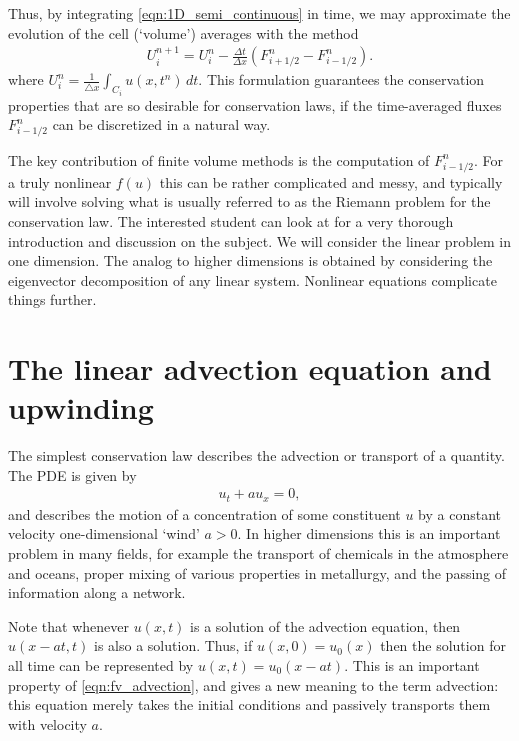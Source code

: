 Thus, by integrating \eqref{eqn:1D_semi_continuous} in time, we may approximate the evolution of the cell (`volume') averages with the method
\begin{align}\label{eqn:flux_form}
U_i^{n+1} = U_i^n - \frac{\Delta t}{\Delta x} \left(F^n_{i+1/2}-F^n_{i-1/2}\right).
\end{align}
where $U_i^n = \frac{1}{\triangle x} \int_{C_i} u(x,t^n) \, dt$.
This formulation guarantees the conservation properties that are so desirable for conservation laws, if the time-averaged fluxes $F_{i-1/2}^n$ can be discretized in a natural way.

The key contribution of finite volume methods is the computation of $F_{i-1/2}^n$.
For a truly nonlinear $f(u)$ this can be rather complicated and messy, and typically will involve solving what is usually referred to as the Riemann problem for the conservation law.
The interested student can look at \cite{Le2002} for a very thorough introduction and discussion on the subject.
We will consider the linear problem in one dimension.
The analog to higher dimensions is obtained by considering the eigenvector decomposition of any linear system.
Nonlinear equations complicate things further.

\section*{The linear advection equation and upwinding}
The simplest conservation law describes the advection or transport of a quantity.
The PDE is given by
\begin{align}
u_t + au_x = 0, \label{eqn:fv_advection}
\end{align}
and describes the motion of a concentration of some constituent $u$ by a constant velocity one-dimensional `wind' $a>0$.
In higher dimensions this is an important problem in many fields, for example the transport of chemicals in the atmosphere and oceans, proper mixing of various properties in metallurgy, and the passing of information along a network.

Note that whenever $u(x,t)$ is a solution of the advection equation, then $u(x-at,t)$ is also a solution.
Thus, if $u(x,0) = u_0(x)$ then the solution for all time can be represented by $u(x,t) = u_0(x-at)$.
This is an important property of \eqref{eqn:fv_advection}, and gives a new meaning to the term advection: this equation merely takes the initial conditions and passively transports them with velocity $a$.

